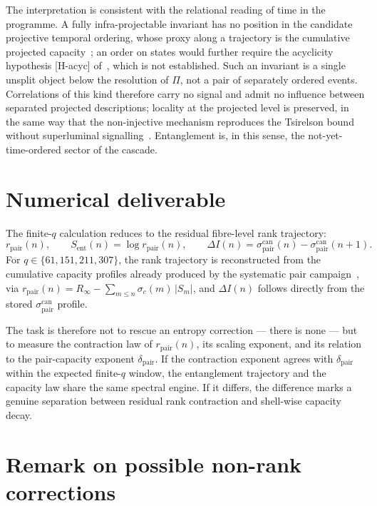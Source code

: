 \documentclass[11pt]{article}
\newcommand{\Sent}{S_{\mathrm{ent}}}
\newcommand{\rpair}{r_{\mathrm{pair}}}
\newcommand{\spair}{\sigma^{\mathrm{can}}_{\mathrm{pair}}}
\begin{document}
    The interpretation is consistent with the relational reading of time in the programme.
    A fully infra-projectable invariant has no position in the candidate projective temporal ordering, whose
    proxy along a trajectory is the cumulative projected capacity~\cite{Beau2026pto}; an order on states would
    further require the acyclicity hypothesis [H-acyc] of~\cite{Beau2026m}, which is not established.
    Such an invariant is a single unsplit object below the resolution of
    $\Pi$, not a pair of separately ordered events.
    Correlations of this kind therefore carry no signal and admit no influence between separated projected
    descriptions; locality at the projected level is preserved, in the same way that the non-injective
    mechanism reproduces the Tsirelson bound without superluminal signalling~\cite{Beau2026b}.
    Entanglement is, in this sense, the not-yet-time-ordered sector of the cascade.

  \section{Numerical deliverable}
    \label{sec:deliverable}

    The finite-$q$ calculation reduces to the residual fibre-level rank trajectory:
    \[
      \rpair(n),
      \qquad
      \Sent(n)=\log \rpair(n),
      \qquad
      \Delta I(n)=\spair(n)-\spair(n+1).
    \]
    For $q\in\{61,151,211,307\}$, the rank trajectory is reconstructed from the cumulative capacity profiles
    already produced by the systematic pair campaign~\cite{Beau2026a29}, via
    $\rpair(n)=R_\infty-\sum_{m\le n}\sigma_c(m)\,|S_m|$, and $\Delta I(n)$ follows directly from the stored
    $\spair$ profile.

    The task is therefore not to rescue an entropy correction --- there is none --- but to measure the
    contraction law of $\rpair(n)$, its scaling exponent, and its relation to the pair-capacity exponent
    $\delta_{\mathrm{pair}}$.
    If the contraction exponent agrees with $\delta_{\mathrm{pair}}$ within the expected finite-$q$ window, the
    entanglement trajectory and the capacity law share the same spectral engine.
    If it differs, the difference marks a genuine separation between residual rank contraction and shell-wise
    capacity decay.

  \section{Remark on possible non-rank corrections}
    \label{sec:remark}
\end{document}
